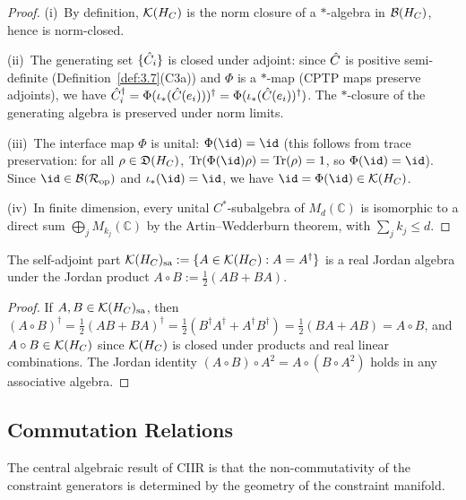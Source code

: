 \begin{proof}
(i)~By definition, $\mathcal{K}(H_C)$ is the norm closure of a $*$-algebra in
$\mathcal{B}(H_C)$, hence is norm-closed.

(ii)~The generating set $\{\hat{C}_i\}$ is closed under adjoint: since
$\hat{C}$ is positive semi-definite (Definition~\ref{def:3.7}(C3a)) and
$\Phi$ is a $*$-map (CPTP maps preserve adjoints), we have
$\hat{C}_i^\dagger = \Phi(\iota_*(\hat{C}(e_i)))^\dagger
= \Phi(\iota_*(\hat{C}(e_i))^\dagger)$.  The $*$-closure of the
generating algebra is preserved under norm limits.

(iii)~The interface map $\Phi$ is unital: $\Phi(\id) = \id$ (this
follows from trace preservation: for all $\rho \in \mathfrak{D}(H_C)$,
$\Tr(\Phi(\id)\rho) = \Tr(\rho) = 1$, so
$\Phi(\id) = \id$).  Since $\id \in \CB(\CR_{\mathrm{op}})$ and
$\iota_*(\id) = \id$, we have
$\id = \Phi(\id) \in \CK(\HC)$.

(iv)~In finite dimension, every unital $C^*$-subalgebra of $M_d(\mathbb{C})$
is isomorphic to a direct sum $\bigoplus_j M_{k_j}(\mathbb{C})$ by the
Artin--Wedderburn theorem, with $\sum_j k_j \leq d$.
\end{proof}

\begin{lemma}
\label{lem:5.2}
The self-adjoint part
$\mathcal{K}(H_C)_{\mathrm{sa}} := \{A \in \mathcal{K}(H_C) : A = A^\dagger\}$
is a real Jordan algebra under the Jordan product
$A \circ B := \frac{1}{2}(AB + BA)$.
\end{lemma}

\begin{proof}
If $A, B \in \mathcal{K}(H_C)_{\mathrm{sa}}$, then
$(A \circ B)^\dagger = \frac{1}{2}(AB + BA)^\dagger
= \frac{1}{2}(B^\dagger A^\dagger + A^\dagger B^\dagger)
= \frac{1}{2}(BA + AB) = A \circ B$,
and $A \circ B \in \mathcal{K}(H_C)$ since $\mathcal{K}(H_C)$ is closed under products
and real linear combinations.  The Jordan identity
$(A \circ B) \circ A^2 = A \circ (B \circ A^2)$ holds in any associative
algebra.
\end{proof}

\subsection{Commutation Relations}
\label{sec:ch5:commutation}

The central algebraic result of CIIR is that the non-commutativity of
the constraint generators is determined by the geometry of the constraint
manifold.

